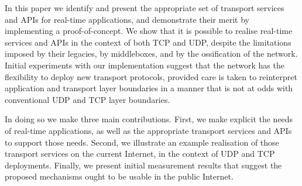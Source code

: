 \documentclass{sig-alternate-05-2015}
\begin{document}

In this paper we identify and present the appropriate set of transport
services and APIs for real-time applications, and demonstrate their
merit by implementing a proof-of-concept. We show that it is possible
to realise real-time services and APIs in the context of both TCP and
UDP, despite the limitations imposed by their legacies, by
middleboxes, and by the ossification of the network.  Initial experiments
with our implementation suggest that
the network has the flexibility to deploy new transport protocols, provided care
is taken to reinterpret application and transport layer boundaries in a
manner that is not at odds with conventional UDP and TCP layer boundaries.


In doing so we make three main contributions. First, we make explicit
the needs of real-time applications, as well as the appropriate
transport services and APIs to support those needs. Second, we
illustrate an example realisation of those transport services on the
current Internet, in the context of UDP and TCP deployments. Finally,
we present initial measurement results that suggest the proposed
mechanisms ought to be usable in the public Internet.

\end{document}
